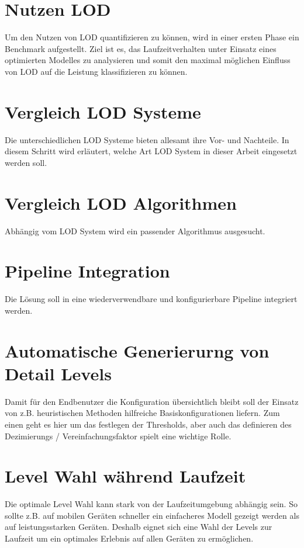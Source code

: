 \section{Nutzen LOD}
Um den Nutzen von LOD quantifizieren zu können, wird in einer ersten Phase ein Benchmark aufgestellt.
Ziel ist es, das Laufzeitverhalten unter Einsatz eines optimierten Modelles zu analysieren und somit den maximal möglichen Einfluss von LOD auf die Leistung klassifizieren zu können.

\section{Vergleich LOD Systeme}
Die unterschiedlichen LOD Systeme bieten allesamt ihre Vor- und Nachteile. In diesem Schritt wird erläutert, welche Art LOD System in dieser Arbeit eingesetzt werden soll.

\section{Vergleich LOD Algorithmen}
Abhängig vom LOD System wird ein passender Algorithmus ausgesucht.

\section{Pipeline Integration}
Die Lösung soll in eine wiederverwendbare und konfigurierbare Pipeline integriert werden.

\section{Automatische Generierurng von Detail Levels}
Damit für den Endbenutzer die Konfiguration übersichtlich bleibt soll der Einsatz von z.B. heuristischen Methoden hilfreiche Basiskonfigurationen liefern.
Zum einen geht es hier um das festlegen der Thresholds, aber auch das definieren des Dezimierungs / Vereinfachungsfaktor spielt eine wichtige Rolle.

\section{Level Wahl während Laufzeit}
Die optimale Level Wahl kann stark von der Laufzeitumgebung abhängig sein. So sollte z.B. auf mobilen Geräten schneller ein einfacheres Modell gezeigt werden als auf leistungsstarken Geräten.
Deshalb eignet sich eine Wahl der Levels zur Laufzeit um ein optimales Erlebnis auf allen Geräten zu ermöglichen.
